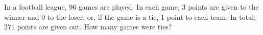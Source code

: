 In a football league, $96$ games are played. In each game, $3$ points are given to the winner and $0$ to the loser, or, if the game is a tie, $1$ point to each team. In total, $271$ points are given out. How many games were ties?
